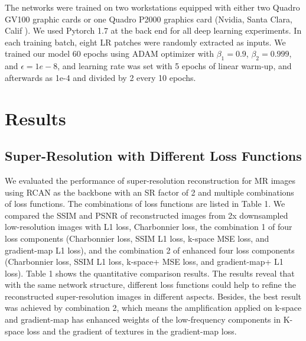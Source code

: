 \documentclass[runningheads]{llncs}
\begin{document}
The networks were trained on two workstations equipped with either two Quadro GV100 graphic cards or one Quadro P2000 graphics card (Nvidia, Santa Clara, Calif ). We used Pytorch 1.7 at the back end for all deep learning experiments. In each training batch, eight LR patches were randomly extracted as inputs. We trained our model 60 epochs using ADAM optimizer with $\beta_1 = 0.9$, $\beta_2 = 0.999$, and $\epsilon= 1e-8$, and learning rate was set with 5 epochs of linear warm-up, and afterwards as 1e-4 and divided by 2 every 10 epochs.

\section{Results}
\subsection{Super-Resolution with Different Loss Functions}
We evaluated the performance of super-resolution reconstruction for MR images using RCAN as the backbone with an SR factor of 2 and multiple combinations of loss functions. The combinations of loss functions are listed in Table 1. We compared the SSIM and PSNR of reconstructed images from 2x downsampled low-resolution images with L1 loss, Charbonnier loss, the combination 1 of four loss components (Charbonnier loss, SSIM L1 loss, k-space MSE loss, and gradient-map L1 loss), and the combination 2 of enhanced four loss components (Charbonnier loss, SSIM L1 loss, k-space+ MSE loss, and gradient-map+ L1 loss). Table 1 shows the quantitative comparison results. The results reveal that with the same network structure, different loss functions could help to refine the reconstructed super-resolution images in different aspects. Besides, the best result was achieved by combination 2, which means the amplification applied on k-space and gradient-map has enhanced weights of the low-frequency components in K-space loss and the gradient of textures in the gradient-map loss. 
\end{document}
